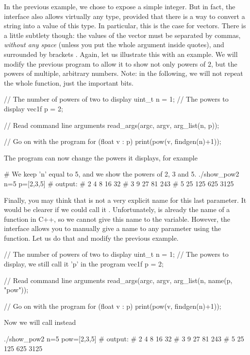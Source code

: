 In the previous example, we chose to expose a simple integer. But in fact, the interface also allows virtually any type, provided that there is a way to convert a string into a value of this type. In particular, this is the case for vectors. There is a little subtlety though: the values of the vector must be separated by commas, \emph{without any space} (unless you put the whole argument inside quotes), and surrounded by brackets \cppinline{[...]}. Again, let us illustrate this with an example. We will modify the previous program to allow it to show not only powers of $2$, but the powers of multiple, arbitrary numbers. Note: in the following, we will not repeat the whole  function, just the important bits.

\begin{example}
\begin{cppcode}
    // The number of powers of two to display
    uint_t n = 1;
    // The powers to display
    vec1f p = {2};

    // Read command line arguments
    read_args(argc, argv, arg_list(n, p));

    // Go on with the program
    for (float v : p) {
        print(pow(v, findgen(n)+1));
    }
\end{cppcode}
\end{example}

The program can now change the powers it displays, for example
\begin{bashcode}
# We keep 'n' equal to 5, and we show the powers of 2, 3 and 5.
./show_pow2 n=5 p=[2,3,5]
# output:
# 2 4 8 16 32
# 3 9 27 81 243
# 5 25 125 625 3125
\end{bashcode}

Finally, you may think that  is not a very explicit name for this last parameter. It would be clearer if we could call it . Unfortunately,  is already the name of a function in C++, so we cannot give this name to the variable. However, the  interface allows you to manually give a name to any parameter using the  function. Let us do that and modify the previous example.

\begin{example}
\begin{cppcode}
    // The number of powers of two to display
    uint_t n = 1;
    // The powers to display, we still call it 'p' in the program
    vec1f p = {2};

    // Read command line arguments
    read_args(argc, argv, arg_list(n, name(p, "pow"));

    // Go on with the program
    for (float v : p) {
        print(pow(v, findgen(n)+1));
    }
\end{cppcode}
\end{example}

Now we will call instead
\begin{bashcode}
./show_pow2 n=5 pow=[2,3,5]
# output:
# 2 4 8 16 32
# 3 9 27 81 243
# 5 25 125 625 3125
\end{bashcode}
